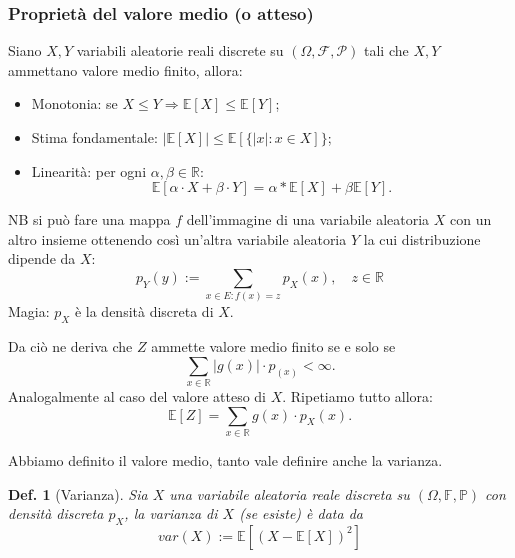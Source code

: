 \documentclass{article}
\newtheorem{definition}{Def.}[section]
\begin{document}
\subsubsection{Proprietà del valore medio (o atteso)}
Siano $X, Y$ variabili aleatorie reali discrete su $(\Omega, \mathcal{F, P})$
tali che $X, Y$ ammettano valore medio finito, allora:
\begin{itemize}
	\item Monotonia: se $X \leq Y \Rightarrow \mathbb{E}[X] \leq \mathbb{E}[Y]$;

	\item Stima fondamentale: $|\mathbb{E}[X]| \leq \mathbb{E}[\{|x|: x \in X]\}$;

	\item Linearità: per ogni $\alpha, \beta \in \mathbb{R}$:
		\begin{equation}
			\mathbb{E}[\alpha \cdot X + \beta \cdot Y] = \alpha * \mathbb{E}[X]
			+ \beta \mathbb{E}[Y].
		\end{equation}

\end{itemize}

NB si può fare una mappa $f$ dell'immagine di una variabile aleatoria $X$ con un altro
insieme ottenendo così un'altra variabile aleatoria $Y$ la cui distribuzione dipende
da $X$:
\begin{equation}
	p_Y(y) := \sum_{x \in E: f(x) = z} p_X(x), \quad z \in \mathbb{R} 
\end{equation}
Magia: $p_X$ è la densità discreta di $X$.

Da ciò ne deriva che $Z$ ammette valore medio finito se e solo se
\begin{equation*}
	\sum_{x \in \mathbb{R}} |g(x)| \cdot p_(x) < \infty.
\end{equation*}
Analogalmente al caso del valore atteso di $X$.
Ripetiamo tutto allora:
\begin{equation}
	\mathbb{E}[Z] = \sum_{x \in \mathbb{R}} g(x) \cdot p_X(x).
\end{equation}

Abbiamo definito il valore medio, tanto vale definire anche la varianza.
\begin{definition}[Varianza]
	Sia $X$ una variabile aleatoria reale discreta su $(\Omega, \mathbb{F, P})$
	con densità discreta $p_X$, la varianza di $X$ (se esiste) è data da
	\begin{equation}
		var(X) := \mathbb{E}[(X - \mathbb{E}[X])^2]
	\end{equation}
\end{definition}
\end{document}
